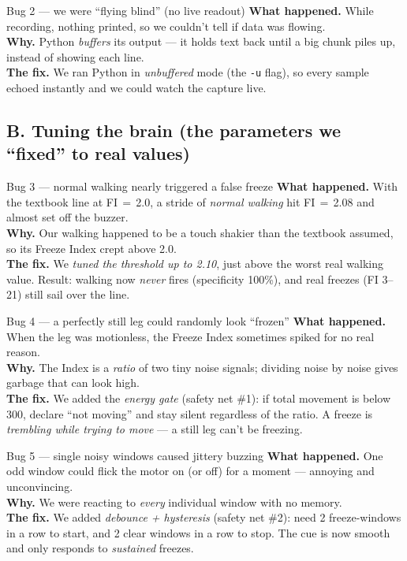 \documentclass[11pt]{article}
\begin{document}
\begin{fixcard}{Bug 2 --- we were ``flying blind'' (no live readout)}
\textbf{What happened.} While recording, nothing printed, so we couldn't tell if
data was flowing. \\
\textbf{Why.} Python \emph{buffers} its output --- it holds text back until a big
chunk piles up, instead of showing each line. \\
\textbf{The fix.} We ran Python in \emph{unbuffered} mode (the \texttt{-u} flag),
so every sample echoed instantly and we could watch the capture live.
\end{fixcard}

\subsection*{B. Tuning the brain (the parameters we ``fixed'' to real values)}

\begin{fixcard}{Bug 3 --- normal walking nearly triggered a false freeze}
\textbf{What happened.} With the textbook line at FI\,$=$\,2.0, a stride of
\emph{normal walking} hit FI\,$=$\,2.08 and almost set off the buzzer. \\
\textbf{Why.} Our walking happened to be a touch shakier than the textbook
assumed, so its Freeze Index crept above 2.0. \\
\textbf{The fix.} We \emph{tuned the threshold up to 2.10}, just above the worst
real walking value. Result: walking now \emph{never} fires (specificity 100\%),
and real freezes (FI 3--21) still sail over the line.
\end{fixcard}

\begin{fixcard}{Bug 4 --- a perfectly still leg could randomly look ``frozen''}
\textbf{What happened.} When the leg was motionless, the Freeze Index sometimes
spiked for no real reason. \\
\textbf{Why.} The Index is a \emph{ratio} of two tiny noise signals; dividing
noise by noise gives garbage that can look high. \\
\textbf{The fix.} We added the \emph{energy gate} (safety net \#1): if total
movement is below 300, declare ``not moving'' and stay silent regardless of the
ratio. A freeze is \emph{trembling while trying to move} --- a still leg can't be
freezing.
\end{fixcard}

\begin{fixcard}{Bug 5 --- single noisy windows caused jittery buzzing}
\textbf{What happened.} One odd window could flick the motor on (or off) for a
moment --- annoying and unconvincing. \\
\textbf{Why.} We were reacting to \emph{every} individual window with no memory. \\
\textbf{The fix.} We added \emph{debounce + hysteresis} (safety net \#2): need 2
freeze-windows in a row to start, and 2 clear windows in a row to stop. The cue
is now smooth and only responds to \emph{sustained} freezes.
\end{fixcard}
\end{document}
